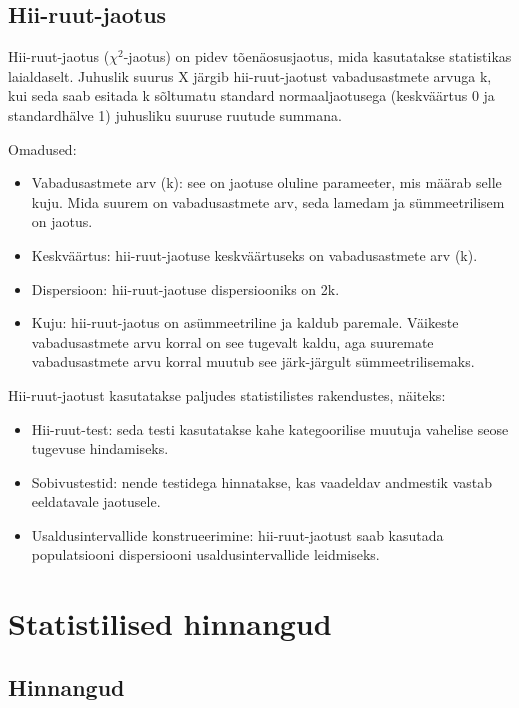 \documentclass[
]{book}
\providecommand{\tightlist}{%
  \setlength{\itemsep}{0pt}\setlength{\parskip}{0pt}}
\begin{document}
\section{Hii-ruut-jaotus}\label{hii-ruut-jaotus}

Hii-ruut-jaotus (\(\chi^2\)-jaotus) on pidev tõenäosusjaotus, mida kasutatakse statistikas laialdaselt. Juhuslik suurus X järgib hii-ruut-jaotust vabadusastmete arvuga k, kui seda saab esitada k sõltumatu standard normaaljaotusega (keskväärtus 0 ja standardhälve 1) juhusliku suuruse ruutude summana.

Omadused:

\begin{itemize}
\tightlist
\item
  Vabadusastmete arv (k): see on jaotuse oluline parameeter, mis määrab selle kuju. Mida suurem on vabadusastmete arv, seda lamedam ja sümmeetrilisem on jaotus.
\item
  Keskväärtus: hii-ruut-jaotuse keskväärtuseks on vabadusastmete arv (k).
\item
  Dispersioon: hii-ruut-jaotuse dispersiooniks on 2k.
\item
  Kuju: hii-ruut-jaotus on asümmeetriline ja kaldub paremale. Väikeste vabadusastmete arvu korral on see tugevalt kaldu, aga suuremate vabadusastmete arvu korral muutub see järk-järgult sümmeetrilisemaks.
\end{itemize}

Hii-ruut-jaotust kasutatakse paljudes statistilistes rakendustes, näiteks:

\begin{itemize}
\tightlist
\item
  Hii-ruut-test: seda testi kasutatakse kahe kategoorilise muutuja vahelise seose tugevuse hindamiseks.
\item
  Sobivustestid: nende testidega hinnatakse, kas vaadeldav andmestik vastab eeldatavale jaotusele.
\item
  Usaldusintervallide konstrueerimine: hii-ruut-jaotust saab kasutada populatsiooni dispersiooni usaldusintervallide leidmiseks.
\end{itemize}

\chapter{Statistilised hinnangud}\label{statistilised-hinnangud}

\section{Hinnangud}\label{hinnangud}
\end{document}

